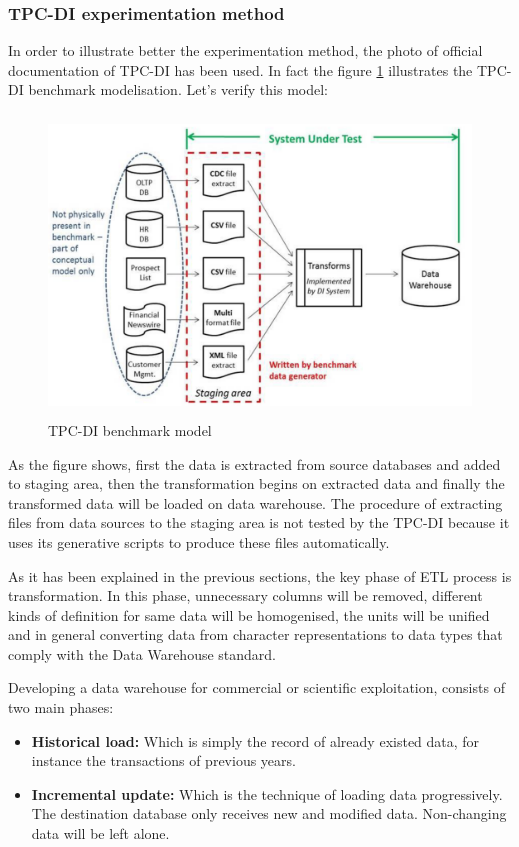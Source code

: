 \documentclass{article}
\newcommand\bld[1]{\textbf{#1}}
\begin{document}
\subsubsection{TPC-DI experimentation method}
In order to illustrate better the experimentation method, the photo of official documentation of TPC-DI has been used. In fact the figure \ref{tpcdi} illustrates the TPC-DI benchmark modelisation. Let's verify this model:
\begin{figure}[H] 
\begin{center}
\includegraphics[width=15cm, height = 8cm]{images2/tpcdi2.png}
\end{center}
\caption{TPC-DI benchmark model}
\label{tpcdi}
\end{figure} 

As the figure shows, first the data is extracted from source databases and added to staging area, then the transformation begins on extracted data and finally the transformed data will be loaded on data warehouse. The procedure of extracting files from data sources to the staging area is not tested by the TPC-DI because it uses its generative scripts to produce these files automatically. 

As it has been explained in the previous sections, the key phase of ETL process is transformation. In this phase, unnecessary columns will be removed, different kinds of definition for same data will be homogenised, the units will be unified and in general converting data from character representations to data types that comply with the Data Warehouse standard.

Developing a data warehouse for commercial or scientific exploitation, consists of two main phases:
\begin{itemize}
    \item \bld{Historical load:} Which is simply  the record of already existed data, for instance the transactions of previous years.
    
    \item \bld{Incremental update:} Which is the technique of loading data progressively. The destination database only receives new and modified data. Non-changing data will be left alone. 
\end{itemize}
\end{document}
